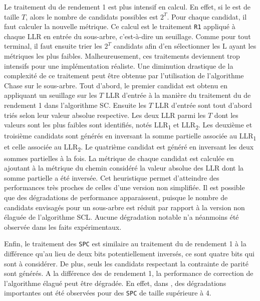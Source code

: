 Le traitement du \noeud de rendement 1 est plus intensif en calcul. En effet, si le \noeud est de taille $T$, alors le nombre de candidats possibles est $2^T$. Pour chaque candidat, il faut calculer la nouvelle métrique. Ce calcul est le traitement \texttt{R1} appliqué à chaque LLR en entrée du sous-arbre, c'est-à-dire un seuillage. Comme pour tout \noeud terminal, il faut ensuite trier les $2^T$ candidats afin d'en sélectionner les $\mathrm{L}$ ayant les métriques les plus faibles. Malheureusement, ces traitements deviennent trop intensifs pour une implémentation réaliste. Une diminution drastique de la complexité de ce traitement peut être obtenue par l'utilisation de l'algorithme \og Chase \fg \cite{chase_class_1972} sur le sous-arbre. Tout d'abord, le premier candidat est obtenu en appliquant un seuillage sur les $T$ LLR d'entrée à la manière du traitement du \noeud de rendement 1 dans l'algorithme SC. Ensuite les $T$ LLR d'entrée sont tout d'abord triés selon leur valeur absolue respective. Les deux LLR parmi les $T$  dont les valeurs sont les plus faibles sont identifiés, notés LLR\textsubscript{1} et LLR\textsubscript{2}. Les deuxième et troisième candidats sont générés en inversant la somme partielle associée au LLR\textsubscript{1} et celle associée au LLR\textsubscript{2}. Le quatrième candidat est généré en inversant les deux sommes partielles à la fois. La métrique de chaque candidat est calculée en ajoutant à la métrique du chemin considéré la valeur absolue des LLR dont la somme partielle a été inversée. Cet heuristique permet d'atteindre des performances très proches de celles d'une version non simplifiée. Il est possible que des dégradations de performance apparaissent, puisque le nombre de candidats envisagés pour un sous-arbre est réduit par rapport à la version non élaguée de l'algorithme SCL. Aucune dégradation notable n'a néanmoins été observée dans les faits expérimentaux.

 

Enfin, le traitement des \noeuds \texttt{SPC} est similaire au traitement du \noeud de rendement 1 à la différence qu'au lieu de deux bits potentiellement inversés, ce sont quatre bits qui sont à considérer. De plus, seuls les candidats respectant la contrainte de parité sont générés. A la différence des \noeuds de rendement 1, la performance de correction de l'algorithme élagué peut être dégradée. En effet, dans \cite{sarkis_fast_2016}, des dégradations importantes ont été observées pour des \noeuds \texttt{SPC} de taille supérieure à 4. 


